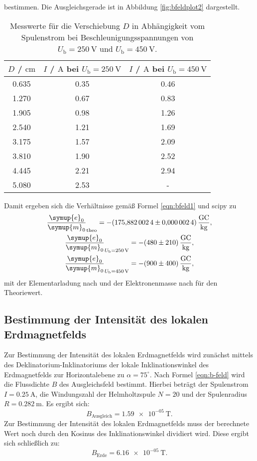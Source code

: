 bestimmen. Die Ausgleichsgerade ist in Abbildung \ref{fig:bfeldplot2} dargestellt.
\begin{table}
	\caption{Messwerte für die Verschiebung $D$ in Abhängigkeit vom Spulenstrom bei Beschleunigungsspannungen von $U_{\mathrm{b}}=\SI{250}{\volt}$ und $U_{\mathrm{b}}=\SI{450}{\volt}$.}
	\label{tab:bfeldtab}
	\centering
	\begin{tabular}{ccc}
	\toprule
		$D$ / $\si{\centi\meter}$ & $I$ / $\si{\ampere}$ bei $U_{\mathrm{b}}=\SI{250}{\volt}$ & $I$ / $\si{\ampere}$ bei $U_{\mathrm{b}}=\SI{450}{\volt}$ \\
	\midrule
		0.635 & 0.35 & 0.46 \\
		1.270 & 0.67 & 0.83 \\
		1.905 & 0.98 & 1.26 \\
		2.540 & 1.21 & 1.69 \\
		3.175 & 1.57 & 2.09 \\
		3.810 & 1.90 & 2.52 \\
		4.445 & 2.21 & 2.94 \\
		5.080 & 2.53 & - \\
	\bottomrule
	\end{tabular}
\end{table}
Damit ergeben sich die Verhältnisse gemäß Formel \eqref{eqn:bfeld1} und scipy \cite{scipy} zu
\begin{gather*}
	\frac{\symup{e}_0}{\symup{m}_0}_{\mathrm{theo}} =  -\SI{175.8820024(24)}{\giga\coulomb\per\kilo\gram} \mathrm{,} \\
	\frac{\symup{e}_0}{\symup{m}_0}_{U_{\mathrm{b}} = \SI{250}{\volt}} = -\SI{480(210)}{\giga\coulomb\per\kilo\gram} \mathrm{,} \\
	\frac{\symup{e}_0}{\symup{m}_0}_{U_{\mathrm{b}} = \SI{450}{\volt}} = -\SI{900(400)}{\giga\coulomb\per\kilo\gram} \mathrm{,}
\end{gather*}
mit der Elementarladung nach \cite{e} und der Elektronenmasse nach \cite{m} für den Theoriewert.
\subsection{Bestimmung der Intensität des lokalen Erdmagnetfelds}
Zur Bestimmung der Intensität des lokalen Erdmagnetfelds wird zunächst mittels des Deklinatorium-Inklinatoriums der lokale Inklinationswinkel des Erdmagnetfelds zur Horizontalebene zu $\alpha=75^\circ$.
Nach Formel \eqref{eqn:b-feld} wird die Flussdichte $B$ des Ausgleichsfeld bestimmt.
Hierbei beträgt der Spulenstrom $I=\SI{0.25}{\ampere}$, die Windungszahl der Helmholtzspule $N=20$ und der Spulenradius $R=\SI{0.282}{\meter}$.
Es ergibt sich:
\begin{equation}
  B_\mathrm{Ausgleich}=\SI{1.59e-05}{\tesla} \text{.}
\end{equation}
Zur Bestimmung der Intensität des lokalen Erdmagnetfelds muss der berechnete Wert noch durch den Kosinus des Inklinationswinkel dividiert wird.
Diese ergibt sich schließlich zu:
\begin{equation}
  B_\mathrm{Erde}=\SI{6.16e-05}{\tesla} \text{.}
\end{equation}
